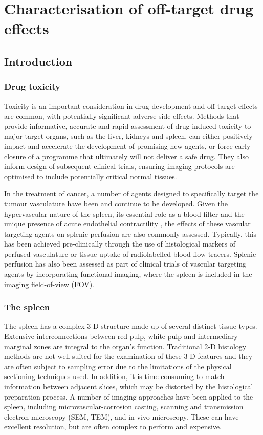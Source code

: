 \chapter{Characterisation of off-target drug effects}
	
	\section{Introduction}
	\subsection{Drug toxicity}
	
	
	
	Toxicity is an important consideration in drug development and off-target effects are common, with potentially significant adverse side-effects. Methods that provide informative, accurate and rapid assessment of drug-induced toxicity to major target organs, such as the liver, kidneys and spleen, can either positively impact and accelerate the development of promising new agents, or force early closure of a programme that ultimately will not deliver a safe drug. They also inform design of subsequent clinical trials, ensuring imaging protocols are optimised to include potentially critical normal tissues.
	
	
	In the treatment of cancer, a number of agents designed to specifically target the tumour vasculature have been and continue to be developed. Given the hypervascular nature of the spleen, its essential role as a blood filter and the unique presence of acute endothelial contractility \cite{raganspontaneous1988}, the effects of these vascular targeting agents on splenic perfusion are also commonly assessed. Typically, this has been achieved pre-clinically through the use of histological markers of perfused vasculature or tissue uptake of radiolabelled blood flow tracers. \cite{cullistumour2006, horsmanvascular2003} Splenic perfusion has also been assessed as part of clinical trials of vascular targeting agents by incorporating functional imaging, where the spleen is included in the imaging field-of-view (FOV). \cite{andersonassessment2003, evelhochmagnetic2004} 
	
	
	\subsection{The spleen}
	The spleen has a complex 3-D structure made up of several distinct tissue types. Extensive interconnections between red pulp, white pulp and intermediary marginal zones are integral to the organ's function. \cite{groomthe1987} Traditional 2-D histology methods are not well suited for the examination of these 3-D features and they are often subject to sampling error due to the limitations of the physical sectioning techniques used. In addition, it is time-consuming to match information between adjacent slices, which may be distorted by the histological preparation process. A number of imaging approaches have been applied to the spleen, including microvascular-corrosion casting, scanning and transmission electron microscopy (SEM, TEM), and in vivo microscopy. \cite{groomthe1987}  These can have excellent resolution, but are often complex to perform and expensive.
	
